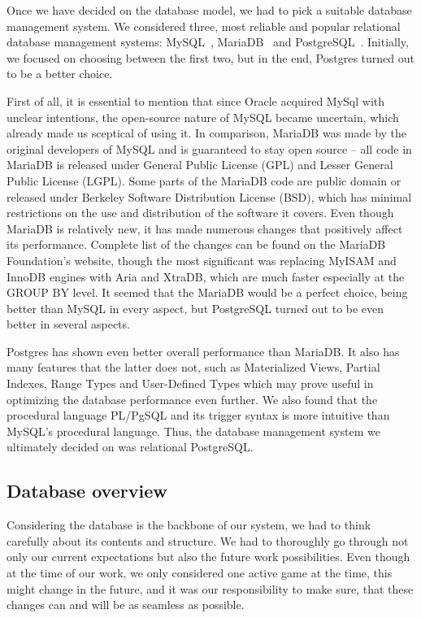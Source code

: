 Once we have decided on the database model, we had to pick a suitable database management system. We considered three, most reliable and popular relational database management systems: MySQL~\cite{mysql}, MariaDB~\cite{mariadb} and PostgreSQL~\cite{postgresql}. Initially, we focused on choosing between the first two, but in the end, Postgres turned out to be a better choice.

First of all, it is essential to mention that since Oracle acquired MySql with unclear intentions, the open-source nature of MySQL became uncertain, which already made us sceptical of using it. In comparison, MariaDB was made by the original developers of MySQL and is guaranteed to stay open source -- all code in MariaDB is released under General Public License (GPL) and Lesser General Public License (LGPL). Some parts of the MariaDB code are public domain or released under Berkeley Software Distribution License (BSD), which has minimal restrictions on the use and distribution of the software it covers. Even though MariaDB is relatively new, it has made numerous changes that positively affect its performance. Complete list of the changes can be found on the MariaDB Foundation's website, though the most significant was replacing MyISAM and InnoDB engines with Aria and XtraDB, which are much faster especially at the GROUP BY level. It seemed that the MariaDB would be a perfect choice, being better than MySQL in every aspect, but PostgreSQL turned out to be even better in several aspects. 

Postgres has shown even better overall performance than MariaDB. It also has many features that the latter does not, such as Materialized Views, Partial Indexes, Range Types and User-Defined Types which may prove useful in optimizing the database performance even further. We also found that the procedural language PL/PgSQL and its trigger syntax is more intuitive than MySQL's procedural language. Thus, the database management system we ultimately decided on was relational PostgreSQL.

\subsection{Database overview}


Considering the database is the backbone of our system, we had to think carefully about its contents and structure. We had to thoroughly go through not only our current expectations but also the future work possibilities. Even though at the time of our work, we only considered one active game at the time, this might change in the future, and it was our responsibility to make sure, that these changes can and will be as seamless as possible. 

